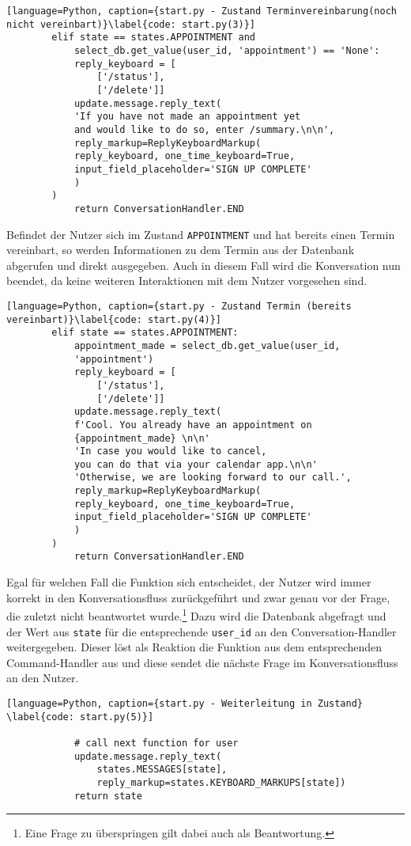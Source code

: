             \begin{lstlisting}[language=Python, caption={start.py - Zustand Terminvereinbarung(noch nicht vereinbart)}\label{code: start.py(3)}]
        elif state == states.APPOINTMENT and 
            select_db.get_value(user_id, 'appointment') == 'None':
            reply_keyboard = [
                ['/status'], 
                ['/delete']]
            update.message.reply_text(
            'If you have not made an appointment yet 
            and would like to do so, enter /summary.\n\n',
            reply_markup=ReplyKeyboardMarkup(
            reply_keyboard, one_time_keyboard=True, 
            input_field_placeholder='SIGN UP COMPLETE'
            )
        )
            return ConversationHandler.END
            \end{lstlisting}

            Befindet der Nutzer sich im Zustand \verb|APPOINTMENT| und hat bereits einen Termin vereinbart, so werden Informationen zu dem Termin aus der Datenbank abgerufen und direkt ausgegeben. Auch in diesem Fall wird die Konversation nun beendet, da keine weiteren Interaktionen mit dem Nutzer vorgesehen sind.
            \begin{lstlisting}[language=Python, caption={start.py - Zustand Termin (bereits vereinbart)}\label{code: start.py(4)}]
        elif state == states.APPOINTMENT:
            appointment_made = select_db.get_value(user_id, 
            'appointment')
            reply_keyboard = [
                ['/status'], 
                ['/delete']]
            update.message.reply_text(
            f'Cool. You already have an appointment on 
            {appointment_made} \n\n'
            'In case you would like to cancel, 
            you can do that via your calendar app.\n\n'
            'Otherwise, we are looking forward to our call.',
            reply_markup=ReplyKeyboardMarkup(
            reply_keyboard, one_time_keyboard=True, 
            input_field_placeholder='SIGN UP COMPLETE'
            )
        )
            return ConversationHandler.END
            \end{lstlisting}
            Egal für welchen Fall die Funktion sich entscheidet, der Nutzer wird immer korrekt in den Konversationsfluss zurückgeführt und zwar genau vor der Frage, die zuletzt nicht beantwortet wurde.\footnote{Eine Frage zu überspringen gilt dabei auch als Beantwortung.} Dazu wird die Datenbank abgefragt und der Wert aus \verb|state| für die entsprechende \verb|user_id| an den Conversation-Handler weitergegeben. Dieser löst als Reaktion die Funktion aus dem entsprechenden Command-Handler aus und diese sendet die nächste Frage im Konversationsfluss an den Nutzer. \\
            \begin{lstlisting}[language=Python, caption={start.py - Weiterleitung in Zustand} \label{code: start.py(5)}]

            # call next function for user
            update.message.reply_text(
                states.MESSAGES[state], 
                reply_markup=states.KEYBOARD_MARKUPS[state])
            return state
            \end{lstlisting}

